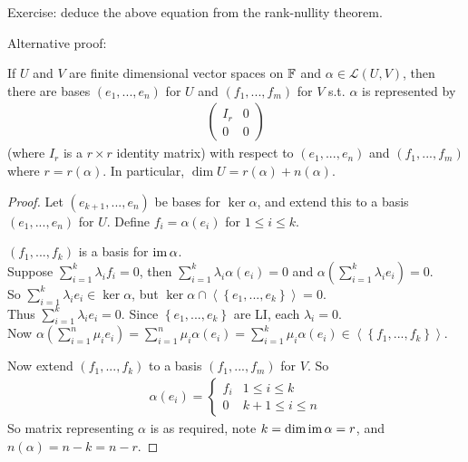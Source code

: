 \documentclass[a4paper]{article}
\begin{document}
Exercise: deduce the above equation from the rank-nullity theorem.

Alternative proof:
\begin{prop}
If $U$ and $V$ are finite dimensional vector spaces on $\mathbb{F}$ and $\alpha \in\mathcal{L}\left(U,V\right)$, then there are bases $\left(e_1,...,e_n\right)$ for $U$ and $\left(f_1,...,f_m\right)$ for $V$ s.t. $\alpha$ is represented by
\begin{equation*}
\begin{aligned}
\left(\begin{matrix}
I_r & 0\\
0 & 0
\end{matrix}
\right)
\end{aligned}
\end{equation*}
(where $I_r$ is a $r\times r$ identity matrix) with respect to $\left(e_1,...,e_n\right)$ and $\left(f_1,...,f_m\right)$ where $r = r\left(\alpha\right)$. In particular, $\dim U = r\left(\alpha\right)+n\left(\alpha\right)$.
\begin{proof}
Let $\left(e_{k+1},...,e_n\right)$ be bases for $\ker\alpha$, and extend this to a basis $\left(e_1,...,e_n\right)$ for $U$. Define $f_i=\alpha\left(e_i\right)$ for $1 \leq i \leq k$.
\begin{claim}
$\left(f_1,...,f_k\right)$ is a basis for $\operatorname{im} \alpha$.\\
Suppose $\sum_{i=1}^k \lambda_i f_i = 0$, then $\sum_{i=1}^k \lambda_i \alpha\left(e_i\right) = 0$ and $\alpha\left(\sum_{i=1}^k \lambda_i e_i\right) = 0$.\\
So $\sum_{i=1}^k \lambda_i e_i \in \ker\alpha$, but $\ker\alpha \cap \left<\left\{e_1,...,e_k\right\}\right> = 0$.\\
Thus $\sum_{i=1}^k \lambda_i e_i = 0$. Since $\left\{e_1,...,e_k\right\}$ are LI, each $\lambda_i = 0$.\\
Now $\alpha\left(\sum_{i=1}^n \mu_i e_i\right) = \sum_{i=1}^n \mu_i \alpha\left(e_i\right) = \sum_{i=1}^k \mu_i \alpha\left(e_i\right) \in \left<\left\{f_1,...,f_k\right\}\right>$.
\end{claim}

Now extend $\left(f_1,...,f_k\right)$ to a basis $\left(f_1,...,f_m\right)$ for $V$. So
\begin{equation*}
\begin{aligned}
\alpha\left(e_i\right) = \left\{\begin{array}{ll}
f_i & 1 \leq i \leq k\\
0 & k+1 \leq i \leq n
\end{array}
\right.
\end{aligned}
\end{equation*}
So matrix representing $\alpha$ is as required, note $k = \dim\operatorname{im}\alpha = r$, and $n\left(\alpha\right) = n-k=n-r$.
\end{proof}
\end{prop}
\end{document}
